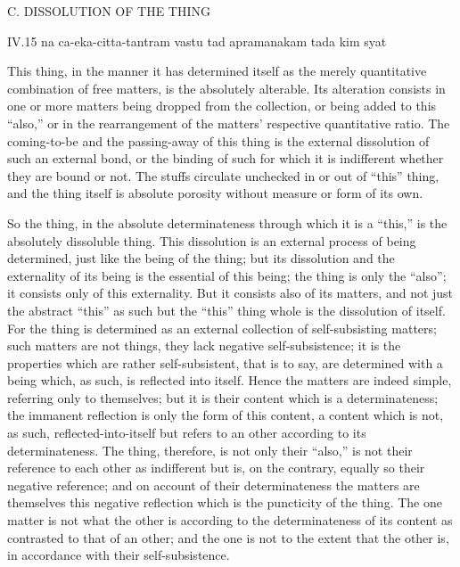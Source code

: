 C. DISSOLUTION OF THE THING

IV.15
na ca-eka-citta-tantram vastu tad apramanakam tada kim syat

This thing, in the manner it has determined itself as the merely quantitative
combination of free matters, is the absolutely alterable.
Its alteration consists in one or more matters being dropped from the collection,
or being added to this “also,”
or in the rearrangement of the matters' respective quantitative ratio.
The coming-to-be and the passing-away of this thing is
the external dissolution of such an external bond,
or the binding of such for which it is indifferent
whether they are bound or not.
The stuffs circulate unchecked in or out of “this” thing,
and the thing itself is absolute porosity
without measure or form of its own.

So the thing, in the absolute determinateness
through which it is a “this,”
is the absolutely dissoluble thing.
This dissolution is an external process of
being determined,
just like the being of the thing;
but its dissolution and the externality of its being is the essential of this being;
the thing is only the “also”;
it consists only of this externality.
But it consists also of its matters,
and not just the abstract “this” as such
but the “this” thing whole is the dissolution of itself.
For the thing is determined as an external collection
of self-subsisting matters;
such matters are not things, they lack negative self-subsistence;
it is the properties which are rather self-subsistent,
that is to say, are determined with a being
which, as such, is reflected into itself.
Hence the matters are indeed simple, referring only to themselves;
but it is their content which is a determinateness;
the immanent reflection is only the form of this content,
a content which is not, as such, reflected-into-itself
but refers to an other according to its determinateness.
The thing, therefore, is not only their “also,”
is not their reference to each other as indifferent
but is, on the contrary, equally so their negative reference;
and on account of their determinateness
the matters are themselves this negative reflection
which is the puncticity of the thing.
The one matter is not what the other is
according to the determinateness of its content
as contrasted to that of an other;
and the one is not to the extent that the other is,
in accordance with their self-subsistence.

